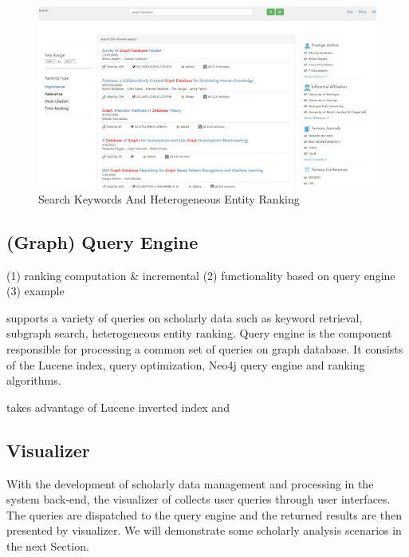 \begin{figure}[tp]
\centering
\includegraphics[width=\textwidth]{searchKeywords110.pdf}
\caption{Search Keywords And Heterogeneous Entity Ranking}
\label{fig: search keywords}
\vspace{-3ex}
\end{figure}

\subsection{(Graph) Query Engine}

(1) ranking computation \& incremental
(2) functionality based on query engine 
(3) example 

\oursystem supports a variety of queries on scholarly data such as keyword retrieval, subgraph search, heterogeneous entity ranking. Query engine is the component responsible for processing a common set of queries on graph database. It consists of the Lucene index, query optimization, Neo4j query engine and ranking algorithms.

\oursystem takes advantage of Lucene inverted index and 


\subsection{Visualizer}
With the development of scholarly data management and processing in the system back-end, the visualizer of \oursystem collects user queries through user interfaces. The queries are dispatched to the query engine and the returned results are then presented by visualizer.
We will demonstrate some scholarly analysis scenarios in the next Section.


